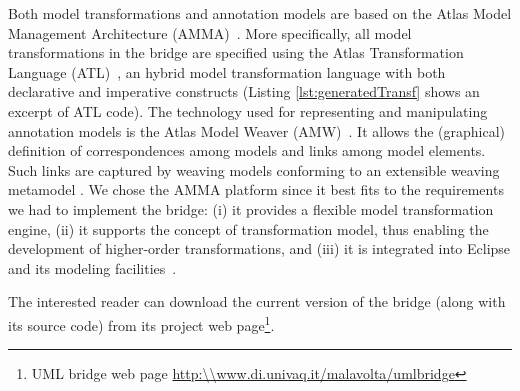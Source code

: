 Both model transformations and annotation models are based on the Atlas Model Management Architecture (AMMA)~\cite{1}.
More specifically, all model transformations in the bridge are specified using the
Atlas Transformation Language (ATL)~\cite{3}, an hybrid model
transformation language with both declarative and imperative constructs (Listing \ref{lst:generatedTransf} shows an excerpt of ATL code).
The technology used for representing and manipulating annotation models is the Atlas Model
Weaver (AMW)~\cite{3}. It allows the (graphical) definition of correspondences
among models and links among model elements. Such
links are captured by weaving models conforming to an extensible weaving metamodel \cite{MCDFthesis}.  
We chose the AMMA platform since it best fits to
the requirements we had to implement the bridge: (i) it provides a flexible model transformation engine, 
(ii) it supports the concept of transformation model, thus enabling the development of higher-order transformations,
and (iii) it is integrated into Eclipse and its modeling facilities~\cite{bezivin_06_canonical}.

The interested reader can download the current version of the bridge (along with its source code) from its project 
web page\footnote{UML bridge web page \small{\url{http:\\www.di.univaq.it/malavolta/umlbridge}}}. 




